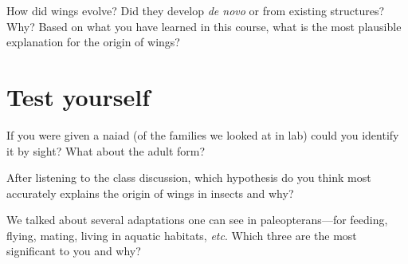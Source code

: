 \begin{theo}
{}How did wings evolve? Did they develop \textit{de novo} or from existing structures? Why? Based on what you have learned in this course, what is the most plausible explanation for the origin of wings?
\end{theo}

\section*{Test yourself}
If you were given a naiad (of the families we looked at in lab) could you identify it by sight? What about the adult form?\vspace{3mm}

\noindent{}After listening to the class discussion, which hypothesis do you think most accurately explains the origin of wings in insects and why?\vspace{3mm}

\noindent{}We talked about several adaptations one can see in paleopterans---for feeding, flying, mating, living in aquatic habitats, \textit{etc}. Which three are the most significant to you and why?

\clearpage
\thispagestyle{empty}
